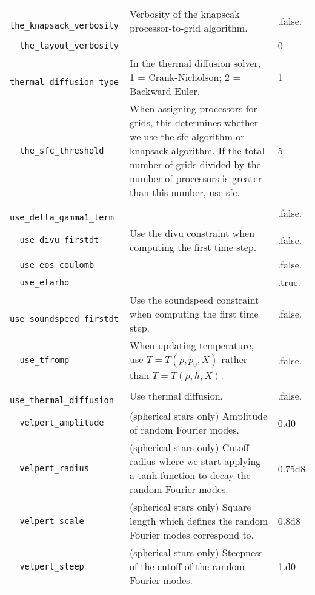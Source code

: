 {\begin{center}
\begin{longtable}{|l|p{3.25in}|l|}
\verb=  the_knapsack_verbosity =  & Verbosity of the knapscak processor-to-grid
                                           algorithm.  &  .false. \\
\verb=  the_layout_verbosity =  &   &  0 \\
\verb=  thermal_diffusion_type =  & In the thermal diffusion solver, 1 = 
                                           Crank-Nicholson; 2 = Backward Euler.  &  1 \\
\verb=  the_sfc_threshold =  & When assigning processors for grids, this determines 
                                     whether we use the sfc algorithm or knapsack 
                                     algorithm.  If the total number of grids divided by 
                                     the number of processors is greater than this number, 
                                     use sfc.  & 5 \\
\verb=  use_delta_gamma1_term =  &   &  .false. \\
\verb=  use_divu_firstdt =  & Use the divu constraint when computing the first
                                   time step.  &  .false. \\
\verb=  use_eos_coulomb =  &   &  .false. \\
\verb=  use_etarho =  &   &  .true. \\
\verb=  use_soundspeed_firstdt =  & Use the soundspeed constraint when computing the
                                           first time step.  &  .false. \\
\verb=  use_tfromp =  & When updating temperature, use $T=T(\rho,p_0,X) $ rather than
                            $T=T(\rho,h,X)$. &  .false. \\
\verb=  use_thermal_diffusion =  & Use thermal diffusion.  &  .false. \\
\verb=  velpert_amplitude =  & (spherical stars only) Amplitude of random Fourier
                                     modes.  &  0.d0 \\
\verb=  velpert_radius =  & (spherical stars only) Cutoff radius where we start 
                                 applying a tanh function to decay the random Fourier
                                 modes. &  0.75d8 \\
\verb=  velpert_scale =  & (spherical stars only) Square length which defines the 
                                random Fourier modes correspond to. &  0.8d8 \\
\verb=  velpert_steep =  & (spherical stars only) Steepness of the cutoff of the random
                                Fourier modes. &  1.d0 \\

\end{longtable}
\end{center}}
